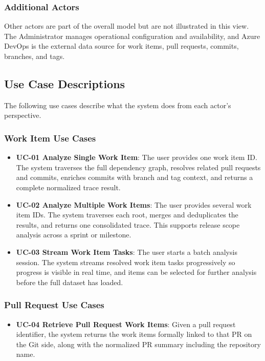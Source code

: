 \subsubsection{Additional Actors}

Other actors are part of the overall model but are not illustrated in this
view. The Administrator manages operational configuration and availability,
and Azure DevOps is the external data source for work items, pull requests,
commits, branches, and tags.

\subsection{Use Case Descriptions}
\label{subsec:use-cases}

The following use cases describe what the system does from each actor's
perspective.

\subsubsection{Work Item Use Cases}

\begin{itemize}
  \item \textbf{UC-01  Analyze Single Work Item}: The user provides one work item ID. The system traverses the full dependency graph, resolves related pull requests and commits, enriches commits with branch and tag context, and returns a complete normalized trace result.

  \item \textbf{UC-02  Analyze Multiple Work Items}: The user provides several work item IDs. The system traverses each root, merges and deduplicates the results, and returns one consolidated trace. This supports release scope analysis across a sprint or milestone.

  \item \textbf{UC-03  Stream Work Item Tasks}: The user starts a batch analysis session. The system streams resolved work item tasks progressively so progress is visible in real time, and items can be selected for further analysis before the full dataset has loaded.
\end{itemize}

\subsubsection{Pull Request Use Cases}

\begin{itemize}
  \item \textbf{UC-04  Retrieve Pull Request Work Items}: Given a pull request identifier, the system returns the work items formally linked to that PR on the Git side, along with the normalized PR summary including the repository name.
\end{itemize}

